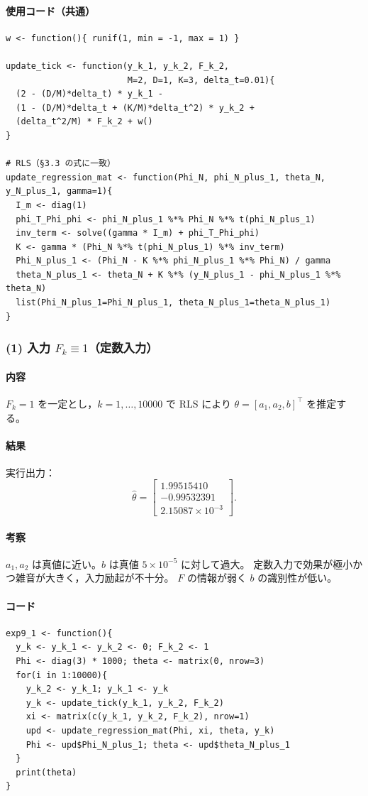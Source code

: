 \paragraph{使用コード（共通）}
\begin{lstlisting}
w <- function(){ runif(1, min = -1, max = 1) }

update_tick <- function(y_k_1, y_k_2, F_k_2,
                        M=2, D=1, K=3, delta_t=0.01){
  (2 - (D/M)*delta_t) * y_k_1 -
  (1 - (D/M)*delta_t + (K/M)*delta_t^2) * y_k_2 +
  (delta_t^2/M) * F_k_2 + w()
}

# RLS（§3.3 の式に一致）
update_regression_mat <- function(Phi_N, phi_N_plus_1, theta_N, y_N_plus_1, gamma=1){
  I_m <- diag(1)
  phi_T_Phi_phi <- phi_N_plus_1 %*% Phi_N %*% t(phi_N_plus_1)
  inv_term <- solve((gamma * I_m) + phi_T_Phi_phi)
  K <- gamma * (Phi_N %*% t(phi_N_plus_1) %*% inv_term)
  Phi_N_plus_1 <- (Phi_N - K %*% phi_N_plus_1 %*% Phi_N) / gamma
  theta_N_plus_1 <- theta_N + K %*% (y_N_plus_1 - phi_N_plus_1 %*% theta_N)
  list(Phi_N_plus_1=Phi_N_plus_1, theta_N_plus_1=theta_N_plus_1)
}
\end{lstlisting}

\subsubsection*{(1) 入力 $F_k\equiv 1$（定数入力）}
\paragraph{内容}
$F_k=1$ を一定とし，$k=1,\dots,10000$ で RLS により
$\theta=[a_1,a_2,b]^\top$ を推定する。\cite{exp2025}

\paragraph{結果}
実行出力：
\[
\hat\theta=
\begin{bmatrix}
1.99515410\\
-0.99532391\\
2.15087\times10^{-3}
\end{bmatrix}.
\]

\paragraph{考察}
$a_1,a_2$ は真値に近い。$b$ は真値 $5\times10^{-5}$ に対して過大。
定数入力で効果が極小かつ雑音が大きく，入力励起が不十分。
$F$ の情報が弱く $b$ の識別性が低い。

\paragraph{コード}
\begin{lstlisting}
exp9_1 <- function(){
  y_k <- y_k_1 <- y_k_2 <- 0; F_k_2 <- 1
  Phi <- diag(3) * 1000; theta <- matrix(0, nrow=3)
  for(i in 1:10000){
    y_k_2 <- y_k_1; y_k_1 <- y_k
    y_k <- update_tick(y_k_1, y_k_2, F_k_2)
    xi <- matrix(c(y_k_1, y_k_2, F_k_2), nrow=1)
    upd <- update_regression_mat(Phi, xi, theta, y_k)
    Phi <- upd$Phi_N_plus_1; theta <- upd$theta_N_plus_1
  }
  print(theta)
}
\end{lstlisting}

